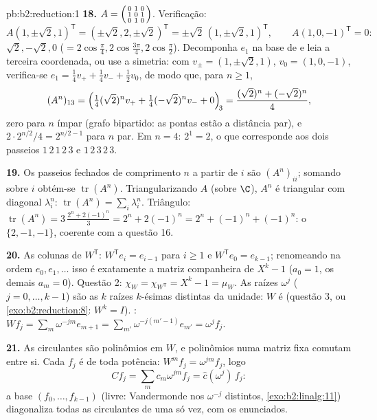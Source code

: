 \begin{solution}{pb:b2:reduction:1}
\textbf{18.} $A = \begin{psmallmatrix} 0&1&0\\ 1&0&1\\
0&1&0\end{psmallmatrix}$. Verificação:
\[
A(1, \pm\sqrt2, 1)^{\mathsf T}
= (\pm\sqrt2, 2, \pm\sqrt2)^{\mathsf T}
= \pm\sqrt2\,(1, \pm\sqrt2, 1)^{\mathsf T},
\qquad
A(1, 0, -1)^{\mathsf T} = 0 :
\]
 $\sqrt2, -\sqrt2, 0$ ($= 2\cos\frac\pi4,
2\cos\frac{3\pi}4, 2\cos\frac\pi2$). Decomponha $e_1$ na
base de  e leia a terceira coordenada, ou use a simetria: com
$v_\pm = (1, \pm\sqrt2, 1)$, $v_0 = (1, 0, -1)$, verifica-se $e_1
= \frac14 v_+ + \frac14 v_- + \frac12 v_0$, de modo que, para $n \geq 1$,
\[
(A^n)_{13} = \Bigl(\tfrac14(\sqrt2)^n v_+ +
\tfrac14(-\sqrt2)^n v_- + 0\Bigr)_{\!3}
= \frac{(\sqrt2)^n + (-\sqrt2)^n}{4},
\]
zero para $n$ ímpar (grafo bipartido: as pontas estão a distância par),
e $2\cdot 2^{n/2}/4 = 2^{n/2 - 1}$ para $n$ par. Em $n = 4$:
$2^{1} = 2$, o que corresponde aos dois passeios $1\,2\,1\,2\,3$ e
$1\,2\,3\,2\,3$.

\textbf{19.} Os passeios fechados de comprimento $n$ a partir de $i$ são
$(A^n)_{ii}$; somando sobre $i$ obtém-se $\operatorname{tr}(A^n)$.
Triangularizando $A$ (sobre $\C$), $A^n$ é triangular com diagonal
$\lambda_i^n$: $\operatorname{tr}(A^n) = \sum_i\lambda_i^n$.
Triângulo: $\operatorname{tr}(A^n) = 3\,\frac{2^n + 2(-1)^n}3 =
2^n + 2(-1)^n = 2^n + (-1)^n + (-1)^n$: o  $\{2, -1,
-1\}$, coerente com a questão 16.

\textbf{20.} As colunas de $W^{\mathsf T}$: $W^{\mathsf T}e_i =
e_{i-1}$ para $i \geq 1$ e $W^{\mathsf T}e_0 = e_{k-1}$;
renomeando na ordem $e_0, e_1, \dots$ isso é exatamente a
matriz companheira de $X^k - 1$ ($a_0 = 1$, os demais $a_m = 0$).
Questão 2: $\chi_{W} = \chi_{W^{\mathsf T}} = X^k - 1 =
\mu_{W}$. As raízes $\omega^j$ ($j = 0, \dots, k-1$) são as $k$
raízes $k$-ésimas distintas da unidade: $W$ é  (questão
3, ou \cref{exo:b2:reduction:8}: $W^k = I$). : $Wf_j
= \sum_m \omega^{-jm}e_{m+1} = \sum_{m'}\omega^{-j(m'-1)}e_{m'}
= \omega^j f_j$.

\textbf{21.} As circulantes são polinômios em $W$, e polinômios
numa matriz fixa comutam entre si. Cada $f_j$ é
 de toda potência: $W^m f_j = \omega^{jm}f_j$, logo
\[
Cf_j = \sum_m c_m\omega^{jm} f_j = \widehat c(\omega^j)\,f_j :
\]
a base $(f_0, \dots, f_{k-1})$ (livre: Vandermonde nos
$\omega^{-j}$ distintos, \cref{exo:b2:linalg:11}) diagonaliza
todas as circulantes de uma só vez, com os  enunciados.


\end{solution}
